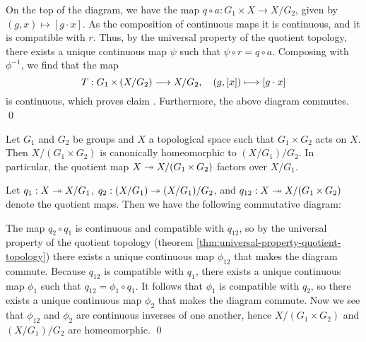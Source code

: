 On the top of the diagram, we have the map $q \circ a : G_1 \times X \to X / G_2$,
given by $(g, x) \mapsto [g \cdot x]$.
As the composition of continuous maps it is continuous,
and it is compatible with $r$.
Thus, by the universal property of the quotient topology,
there exists a unique continuous map $\psi$
such that $\psi \circ r = q \circ a$.
Composing with $\phi^{-1}$, we find that the map
\[ T : G_1 \times {(X / G_2)} \longto X / G_2,
\quad (g, [x]) \longmapsto [g \cdot x] \]
is continuous,
which proves claim .
Furthermore, the above diagram commutes.
\qed

Let $G_1$ and $G_2$ be groups and $X$ a topological space
such that $G_1 \times G_2$ acts on $X$.
Then $X / (G_1 \times G_2)$ is canonically homeomorphic to $(X / G_1) / G_2$.
In particular, the quotient map $X \surj X / (G_1 \times G_2)$ factors over $X / G_1$.

\proof
Let
$q_1 : X \surj X / G_1$,
$q_2 : (X / G_1) \surj (X / G_1) / G_2$,
and $q_{12} : X \surj X / (G_1 \times G_2)$ denote the quotient maps.
Then we have the following commutative diagram:
\begin{center}
\end{center}
The map $q_2 \circ q_1$ is continuous and compatible with $q_{12}$,
so by the universal property of the quotient topology (theorem \ref{thm:universal-property-quotient-topology})
there exists a unique continuous map $\phi_{12}$ that makes the diagram commute.
Because $q_{12}$ is compatible with $q_1$,
there exists a unique continuous map $\phi_1$ such that $q_{12} = \phi_1 \circ q_1$.
It follows that $\phi_1$ is compatible with $q_2$,
so there exists a unique continuous map $\phi_2$ that makes the diagram commute.
Now we see that $\phi_{12}$ and $\phi_2$ are continuous inverses of one another,
hence $X / (G_1 \times G_2)$ and $(X / G_1) / G_2$ are homeomorphic.
\qed

